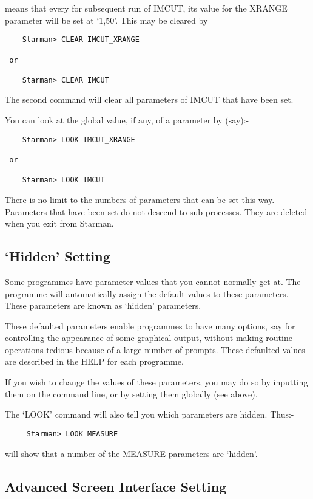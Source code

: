 means that every for subsequent run of IMCUT, its value for the XRANGE
parameter will be set at `1,50'. This may be cleared by
\begin{verbatim}
    Starman> CLEAR IMCUT_XRANGE

 or 

    Starman> CLEAR IMCUT_
\end{verbatim}

The second command will clear all parameters of IMCUT that have been set.

You can look at the global value, if any, of a parameter by (say):-
\begin{verbatim}
    Starman> LOOK IMCUT_XRANGE

 or 

    Starman> LOOK IMCUT_
\end{verbatim}

There is no limit to the numbers of parameters that can be set this way.
Parameters that have been set do not descend to sub-processes. They are
deleted when you exit from Starman. 

\subsection{`Hidden' Setting}

Some programmes have parameter values that you cannot normally get at. The
programme will automatically assign the default values to these parameters.
These parameters are known as `hidden' parameters. 

These defaulted parameters enable programmes to have many options, say for
controlling the appearance of some graphical output, without making routine
operations tedious because of a large number of prompts. These defaulted
values are described in the HELP for each programme. 

If you wish to change the values of these parameters, you may do so by
inputting them on the command line, or by setting them globally (see 
above).

The `LOOK' command will also tell you which parameters are hidden. Thus:-
\begin{verbatim}
     Starman> LOOK MEASURE_
\end{verbatim}

will show that a number of the MEASURE parameters are `hidden'.

\subsection{Advanced Screen Interface Setting}

